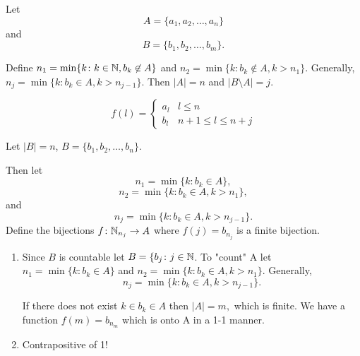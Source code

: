 \documentclass{report}
\begin{document}
  \begin{myproof}
    Let
    $$A = \{a_1, a_2, \dots, a_n\}$$ and
    $$B = \{b_1, b_2, \dots, b_m\}.$$

    Define $n_1=\min \{k \colon k \in \NN, b_k \not \in A\}$ and $n_2 = \min \{k \colon b_k \not \in A, k > n_1\}$. Generally, $n_j = \min \{k : b_k \in A, k > n_{j-1} \}.$ Then $|A|=n$ and $|B \setminus A|=j.$

    $$
f(l) = 
  \begin{cases} 
  a_l &  l \leq n \\
  b_l & n+1 \leq l \leq n+j
   \end{cases}
    $$
  \end{myproof}


  \begin{myproof}
    Let $|B|=n$, $B=\{b_1, b_2,\dots,b_n\}.$

    Then let $$n_1 = \min \{k \colon b_k \in A\},$$
    $$n_2 = \min \{k \colon b_k \in A, k > n_1\},$$ and $$n_j = \min \{k \colon b_k \in A, k > n_{j-1}\}.$$ Define the bijections $f \colon \NN_{n_j} \rightarrow A$ where $f(j) = b_{n_j}$ is a finite bijection.
  \end{myproof}



  \begin{myproof}
      \begin{enumerate}

        \item Since $B$ is countable let $B = \{b_j \colon j \in\NN$. To "count" A let $n_1 = \min \{k \colon b_k \in A\}$ and $n_2 = \min \{k \colon b_k \in A, k > n_1\}$. Generally, $$n_j = \min \{k \colon b_k \in A, k > n_{j-1}\}.$$

    If there does not exist $k \in b_k \in A$ then $|A| =m,$ which is finite. We have a function $f(m)= b_{n_m}$ which is onto A in a 1-1 manner. 
  \item Contrapositive of 1!
      \end{enumerate}
  \end{myproof}
\end{document}
